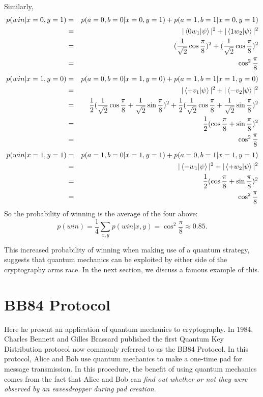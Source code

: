 Similarly,
\begin{eqnarray*}
p(win|x=0,y=1)&=&p(a=0, b=0|x=0, y=1)+p(a=1, b=1|x=0, y=1)\\
&=&|\braket{0 w_1|\psi}|^2 + |\braket{1 w_2|\psi}|^2\\
&=&(\frac{1}{\sqrt{2}}\cos\frac{\pi}{8})^2+(\frac{1}{\sqrt{2}}\cos\frac{\pi}{8})^2\\
&=&\cos^2 \frac{\pi}{8}
\end{eqnarray*}
\begin{eqnarray*}
p(win|x=1,y=0)&=&p(a=0, b=0|x=1, y=0)+p(a=1, b=1|x=1, y=0)\\
&=&|\braket{+ v_1|\psi}|^2 + |\braket{- v_2|\psi}|^2\\
&=&\frac{1}{2}(\frac{1}{\sqrt{2}}\cos\frac{\pi}{8}+\frac{1}{\sqrt{2}}\sin\frac{\pi}{8})^2+\frac{1}{2}(\frac{1}{\sqrt{2}}\cos\frac{\pi}{8}+\frac{1}{\sqrt{2}}\sin\frac{\pi}{8})^2\\
&=&\frac{1}{2}(\cos\frac{\pi}{8}+\sin\frac{\pi}{8})^2\\
&=&\cos^2 \frac{\pi}{8}
\end{eqnarray*}
\begin{eqnarray*}
p(win|x=1,y=1)&=&p(a=1, b=0|x=1, y=1)+p(a=0, b=1|x=1, y=1)\\
&=&|\braket{- w_1|\psi}|^2 + |\braket{+ w_2|\psi}|^2\\
&=&\frac{1}{2}(\cos\frac{\pi}{8}+\sin\frac{\pi}{8})^2\\
&=&\cos^2 \frac{\pi}{8}
\end{eqnarray*}
So the probability of winning is the average of the four above:
\begin{equation*}
    p(win)=\frac{1}{4}\sum_{x,y}p(win|x,y)=\cos^2 \frac{\pi}{8} \approx 0.85.
\end{equation*}


This increased probability of winning when making use of a quantum strategy, suggests that quantum mechanics can be exploited by either side of the cryptography arms race.  In the next section, we discuss a famous example of this.




\pagebreak

\section{BB84 Protocol}
Here he present an application of quantum mechanics to cryptography.  In 1984, Charles Bennett and Gilles Brassard published the first Quantum Key Distribution protocol \cite{Bennett1984} now commonly referred to as the BB84 Protocol. In this protocol, Alice and Bob use quantum mechanics to make a one-time pad for message transmission.  In this procedure, the benefit of using quantum mechanics comes from the fact that Alice and Bob can {\emph{find out whether or not they were observed by an eavesdropper during pad creation}}. 

